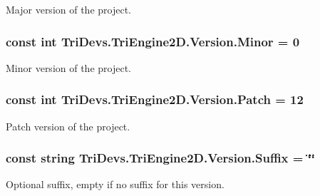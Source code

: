 Major version of the project. 

\hypertarget{class_tri_devs_1_1_tri_engine2_d_1_1_version_a46c99b37d8caad10a9702e9823f6cded}{
\subsubsection[{Minor}]{\setlength{\rightskip}{0pt plus 5cm}const int Tri\-Devs.\-Tri\-Engine2\-D.\-Version.\-Minor = 0}}\label{class_tri_devs_1_1_tri_engine2_d_1_1_version_a46c99b37d8caad10a9702e9823f6cded}


Minor version of the project. 

\hypertarget{class_tri_devs_1_1_tri_engine2_d_1_1_version_a5baa982b0404ea5ed3d2526e26f55809}{
\subsubsection[{Patch}]{\setlength{\rightskip}{0pt plus 5cm}const int Tri\-Devs.\-Tri\-Engine2\-D.\-Version.\-Patch = 12}}\label{class_tri_devs_1_1_tri_engine2_d_1_1_version_a5baa982b0404ea5ed3d2526e26f55809}


Patch version of the project. 

\hypertarget{class_tri_devs_1_1_tri_engine2_d_1_1_version_a5f7a61ae54163decac64e6acbe25e76d}{
\subsubsection[{Suffix}]{\setlength{\rightskip}{0pt plus 5cm}const string Tri\-Devs.\-Tri\-Engine2\-D.\-Version.\-Suffix = \char`\"{}\char`\"{}}}\label{class_tri_devs_1_1_tri_engine2_d_1_1_version_a5f7a61ae54163decac64e6acbe25e76d}


Optional suffix, empty if no suffix for this version. 

